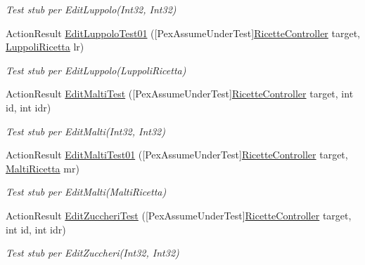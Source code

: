 \begin{DoxyCompactItemize}
\begin{DoxyCompactList}\small\item\em Test stub per Edit\+Luppolo(\+Int32, Int32)\end{DoxyCompactList}\item 
Action\+Result \mbox{\hyperlink{class_brew_day2_1_1_controllers_1_1_tests_1_1_ricette_controller_test_a2d3b276eacf5a6cea4dd35e480193f70}{Edit\+Luppolo\+Test01}} (\mbox{[}Pex\+Assume\+Under\+Test\mbox{]}\mbox{\hyperlink{class_brew_day2_1_1_controllers_1_1_ricette_controller}{Ricette\+Controller}} target, \mbox{\hyperlink{class_brew_day2_1_1_models_1_1_luppoli_ricetta}{Luppoli\+Ricetta}} lr)
\begin{DoxyCompactList}\small\item\em Test stub per Edit\+Luppolo(\+Luppoli\+Ricetta)\end{DoxyCompactList}\item 
Action\+Result \mbox{\hyperlink{class_brew_day2_1_1_controllers_1_1_tests_1_1_ricette_controller_test_a67d5fbeeef2a59c8905ae5dd82bcdfd3}{Edit\+Malti\+Test}} (\mbox{[}Pex\+Assume\+Under\+Test\mbox{]}\mbox{\hyperlink{class_brew_day2_1_1_controllers_1_1_ricette_controller}{Ricette\+Controller}} target, int id, int idr)
\begin{DoxyCompactList}\small\item\em Test stub per Edit\+Malti(\+Int32, Int32)\end{DoxyCompactList}\item 
Action\+Result \mbox{\hyperlink{class_brew_day2_1_1_controllers_1_1_tests_1_1_ricette_controller_test_a85a03db5b2867af915c4f670cd5100c8}{Edit\+Malti\+Test01}} (\mbox{[}Pex\+Assume\+Under\+Test\mbox{]}\mbox{\hyperlink{class_brew_day2_1_1_controllers_1_1_ricette_controller}{Ricette\+Controller}} target, \mbox{\hyperlink{class_brew_day2_1_1_models_1_1_malti_ricetta}{Malti\+Ricetta}} mr)
\begin{DoxyCompactList}\small\item\em Test stub per Edit\+Malti(\+Malti\+Ricetta)\end{DoxyCompactList}\item 
Action\+Result \mbox{\hyperlink{class_brew_day2_1_1_controllers_1_1_tests_1_1_ricette_controller_test_ad23eef82d2d6cb0fd15d5b6dfd69e79b}{Edit\+Zuccheri\+Test}} (\mbox{[}Pex\+Assume\+Under\+Test\mbox{]}\mbox{\hyperlink{class_brew_day2_1_1_controllers_1_1_ricette_controller}{Ricette\+Controller}} target, int id, int idr)
\begin{DoxyCompactList}\small\item\em Test stub per Edit\+Zuccheri(\+Int32, Int32)\end{DoxyCompactList}\item 

\end{DoxyCompactItemize}

